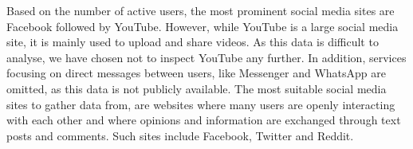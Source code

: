 Based on the number of active users, the most prominent social media sites are
Facebook followed by YouTube. However, while YouTube is a large social media
site, it is mainly used to upload and share videos. As this data is difficult to
analyse, we have chosen not to inspect YouTube any further. In addition,
services focusing on direct messages between users, like Messenger and WhatsApp
are omitted, as this data is not publicly available. The most suitable social
media sites to gather data from, are websites where many users are openly
interacting with each other and where opinions and information are exchanged
through text posts and comments. Such sites include Facebook, Twitter and
Reddit.\nl
